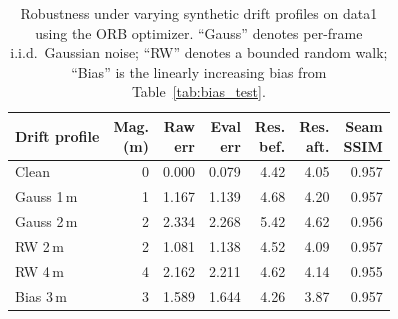 \begin{table}[t]
\centering
\caption{Robustness under varying synthetic drift profiles on data1
         using the ORB optimizer.  ``Gauss'' denotes per-frame i.i.d.\
         Gaussian noise; ``RW'' denotes a bounded random walk;
         ``Bias'' is the linearly increasing bias from
         Table~\ref{tab:bias_test}.}
\label{tab:drift_robustness}
\begin{tabular}{l r rr rr r}
\toprule
Drift profile
  & \parbox{0.8cm}{\centering Mag.\\(m)}
  & \parbox{0.8cm}{\centering Raw\\err}
  & \parbox{0.8cm}{\centering Eval\\err}
  & \parbox{0.8cm}{\centering Res.\\bef.}
  & \parbox{0.8cm}{\centering Res.\\aft.}
  & \parbox{0.9cm}{\centering Seam\\SSIM} \\
\midrule
Clean        & 0 & 0.000 & 0.079 & 4.42 & 4.05 & 0.957 \\
Gauss 1\,m   & 1 & 1.167 & 1.139 & 4.68 & 4.20 & 0.957 \\
Gauss 2\,m   & 2 & 2.334 & 2.268 & 5.42 & 4.62 & 0.956 \\
RW 2\,m      & 2 & 1.081 & 1.138 & 4.52 & 4.09 & 0.957 \\
RW 4\,m      & 4 & 2.162 & 2.211 & 4.62 & 4.14 & 0.955 \\
Bias 3\,m    & 3 & 1.589 & 1.644 & 4.26 & 3.87 & 0.957 \\
\bottomrule
\end{tabular}
\end{table}

